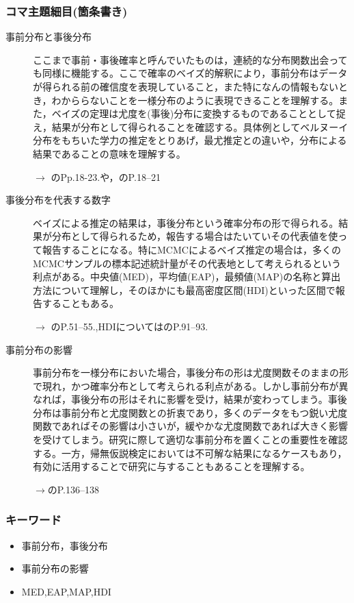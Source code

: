 \subsubsection{コマ主題細目(箇条書き)}
\begin{description}
\item[事前分布と事後分布] ここまで事前・事後確率と呼んでいたものは，連続的な分布関数出会っても同様に機能する。ここで確率のベイズ的解釈により，事前分布はデータが得られる前の確信度を表現していること，また特になんの情報もないとき，わかららないことを一様分布のように表現できることを理解する。また，ベイズの定理は尤度を(事後)分布に変換するものであることとして捉え，結果が分布として得られることを確認する。具体例としてベルヌーイ分布をもちいた学力の推定をとりあげ，最尤推定との違いや，分布による結果であることの意味を理解する。
\begin{flushright}
    $\to$ \citet{Maeda2017}のPp.18-23.や，\citet{豊田201606}のP.18--21
\end{flushright}

\item[事後分布を代表する数字]ベイズによる推定の結果は，事後分布という確率分布の形で得られる。結果が分布として得られるため，報告する場合はたいていその代表値を使って報告することになる。特にMCMCによるベイズ推定の場合は，多くのMCMCサンプルの標本記述統計量がその代表地として考えられるという利点がある。中央値(MED)，平均値(EAP)，最頻値(MAP)の名称と算出方法について理解し，そのほかにも最高密度区間(HDI)といった区間で報告することもある。
\begin{flushright}
    $\to$ \citet{豊田201506}のP.51--55.,HDIについては\citet{Maeda2017}のP.91--93.
\end{flushright}

\item[事前分布の影響]事前分布を一様分布においた場合，事後分布の形は尤度関数そのままの形で現れ，かつ確率分布として考えられる利点がある。しかし事前分布が異なれば，事後分布の形はそれに影響を受け，結果が変わってしまう。事後分布は事前分布と尤度関数との折衷であり，多くのデータをもつ鋭い尤度関数であればその影響は小さいが，緩やかな尤度関数であれば大きく影響を受けてしまう。研究に際して適切な事前分布を置くことの重要性を確認する。一方，帰無仮説検定においては不可解な結果になるケースもあり，有効に活用することで研究に与することもあることを理解する。
\begin{flushright}
    $\to$\citet{Maeda2017}のP.136--138
\end{flushright}

\end{description}
\subsubsection{キーワード}
\begin{itemize}
\item 事前分布，事後分布
\item 事前分布の影響
\item MED,EAP,MAP,HDI
\end{itemize}
